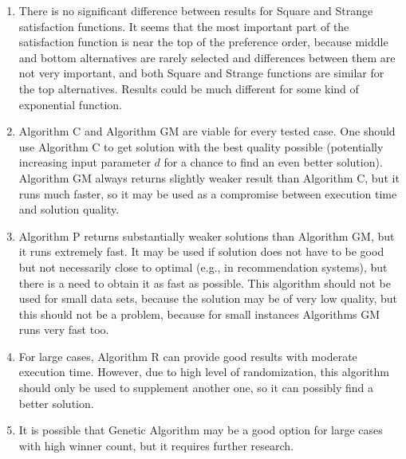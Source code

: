\begin{enumerate}
	\item There is no significant difference between results for Square and Strange satisfaction functions. It seems that the most important part of the satisfaction function is near the top of the preference order, because middle and bottom alternatives are rarely selected and differences between them are not very important, and both Square and Strange functions are similar for the top alternatives. Results could be much different for some kind of exponential function.
	\item Algorithm C and Algorithm GM are viable for every tested case. One should use Algorithm C to get solution with the best quality possible (potentially increasing input parameter $d$ for a chance to find an even better solution). Algorithm GM always returns slightly weaker result than Algorithm C, but it runs much faster, so it may be used as a compromise between execution time and solution quality.
	\item Algorithm P returns substantially weaker solutions than Algorithm GM, but it runs extremely fast. It may be used if solution does not have to be good but not necessarily close to optimal (e.g., in recommendation systems), but there is a need to obtain it as fast as possible. This algorithm should not be used for small data sets, because the solution may be of very low quality, but this should not be a problem, because for small instances Algorithms GM runs very fast too.
	\item For large cases, Algorithm R can provide good results with moderate execution time. However, due to high level of randomization, this algorithm should only be used to supplement another one, so it can possibly find a better solution.
	\item It is possible that Genetic Algorithm may be a good option for large cases with high winner count, but it requires further research.
\end{enumerate}